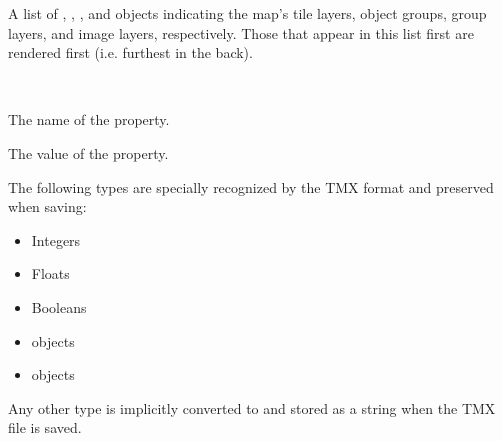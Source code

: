 \documentclass[letterpaper,10pt,english]{sphinxmanual}
\begin{document}
\begin{fulllineitems}
\begin{fulllineitems}
\end{fulllineitems}


\begin{fulllineitems}
\label{index:tmx.GroupLayer.layers}
A list of {\hyperref[index:tmx.Layer]{\emph{}}}, {\hyperref[index:tmx.ObjectGroup]{\emph{}}},
{\hyperref[index:tmx.GroupLayer]{\emph{}}}, and {\hyperref[index:tmx.ImageLayer]{\emph{}}} objects indicating
the map's tile layers, object groups, group layers, and image
layers, respectively.  Those that appear in this list first are
rendered first (i.e. furthest in the back).

\end{fulllineitems}


\end{fulllineitems}


\begin{fulllineitems}
\label{index:tmx.Property}~

\begin{fulllineitems}
\label{index:tmx.Property.name}
The name of the property.

\end{fulllineitems}


\begin{fulllineitems}
\label{index:tmx.Property.value}
The value of the property.

The following types are specially recognized by the TMX format
and preserved when saving:
\begin{itemize}
\item {} 
Integers

\item {} 
Floats

\item {} 
Booleans

\item {} 
{\hyperref[index:tmx.Color]{\emph{}}} objects

\item {} 
 objects

\end{itemize}

Any other type is implicitly converted to and stored as a string
when the TMX file is saved.

\end{fulllineitems}


\end{fulllineitems}
\end{document}
